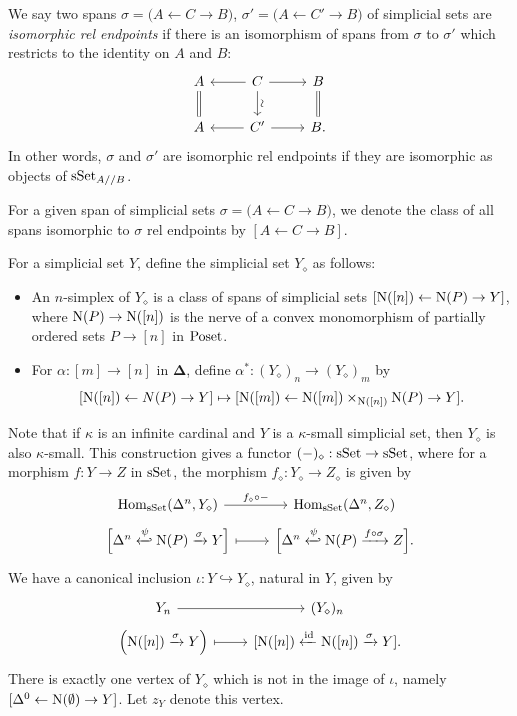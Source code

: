 \documentclass{tac}
\newcommand{\tx}[1]{\textnormal{#1}}
\newcommand{\db}{\mathbf{\Delta}}
\begin{document}
\begin{definition}\label{diamonddefn} We say two spans $\sigma = \big( A\leftarrow C \to B \big)$, $\sigma' = \big( A \leftarrow C' \to B \big)$ of simplicial sets are \emph{isomorphic rel endpoints} if there is an isomorphism of spans from $\sigma$ to $\sigma'$ which restricts to the identity on $A$ and $B$:
\[\begin{tikzcd} A \arrow[equal]{d}{} & C \arrow[]{d}{\rotatebox[origin=c]{90}{$\sim$}} \arrow[]{l} \arrow[]{r} & B \arrow[equal]{d} \\
A & C' \arrow[]{r} \arrow[]{l} & B . \end{tikzcd}\]
In other words, $\sigma$ and $\sigma'$ are isomorphic rel endpoints if they are isomorphic as objects of $\tx{sSet}_{A/ /B}$.

For a given span of simplicial sets $\sigma = \big( A\leftarrow C \to B \big)$, we denote the class of all spans isomorphic to $\sigma$ rel endpoints by $[A\leftarrow C \to B ]$.

\hfill

For a simplicial set $Y$, define the simplicial set $Y_\diamond$ as follows:
\begin{itemize}
\item An $n$-simplex of $Y_\diamond$ is a class of spans of simplicial sets $[\tx{N}([n]) \leftarrow \tx{N}(P) \to Y ]$, where $\tx{N}(P) \to \tx{N}([n])$ is the nerve of a convex monomorphism of partially ordered sets $P\to [n]$ in $\tx{Poset}$.  
\item For $\alpha : [m] \to [n]$ in $\db$, define $\alpha^* : (Y_\diamond)_n \to (Y_\diamond)_m$ by
\[ [ \tx{N}([n]) \leftarrow N(P) \to Y ] \mapsto [ \tx{N}([m]) \leftarrow \tx{N}([m])\times_{\tx{N}([n])} \tx{N}(P) \to Y ]. \]
\end{itemize}
Note that if $\kappa$ is an infinite cardinal and $Y$ is a $\kappa$-small simplicial set, then $Y_\diamond$ is also $\kappa$-small.  This construction gives a functor $(-)_\diamond : \tx{sSet} \to \tx{sSet}$, where for a morphism $f : Y \to Z$ in $\tx{sSet}$, the morphism $f_\diamond : Y_\diamond \to Z_\diamond$ is given by 
\[\begin{tikzcd}
\tx{Hom}_\tx{sSet} (\Delta^n ,  Y_\diamond) \arrow[]{r}{f_\diamond \circ -} & \tx{Hom}_\tx{sSet} (\Delta^n ,  Z_\diamond) \\[-1.5em]
\Big[ \Delta^n \xhookleftarrow{\psi} \tx{N}(P) \xrightarrow{\sigma} Y  \Big] \arrow[mapsto]{r} & \Big[ \Delta^n \xhookleftarrow{\psi} \tx{N}(P) \xrightarrow{f\circ \sigma} Z \Big] .
\end{tikzcd}\]
We have a canonical inclusion $\iota : Y \hookrightarrow Y_\diamond$, natural in $Y$, given by 
\[\begin{tikzcd} Y_n \arrow[]{r} & (Y_\diamond)_n \\[-1.5em]
\left( \tx{N}([n]) \xrightarrow{\sigma} Y \right) \arrow[mapsto]{r} & {[ \tx{N}([n]) \xleftarrow{\tx{id}} \tx{N}([n]) \xrightarrow{\sigma} Y ]}. \end{tikzcd} \]
There is exactly one vertex of $Y_\diamond$ which is not in the image of $\iota$, namely $[\Delta^0 \leftarrow \tx{N}(\emptyset) \to Y]$.  Let $z_Y$ denote this vertex.
\end{definition}
\end{document}
